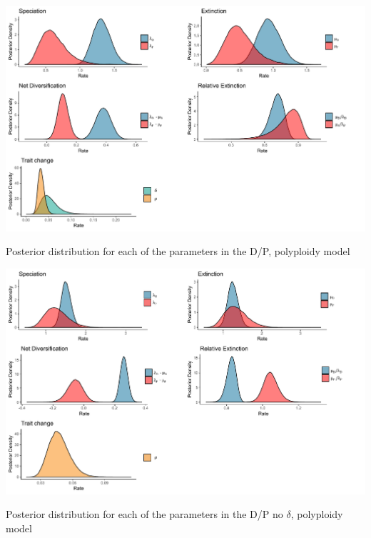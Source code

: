 \begin{suppfigure}
\includegraphics[width=\textwidth]{bisseDPposteriordist.pdf}
\caption{Posterior distribution for each of the parameters in the D/P, polyploidy model} %
\label{suppfigure:DP}
\end{suppfigure}

\begin{suppfigure}
\includegraphics[width=\textwidth]{bisseDPnodipposteriordist.pdf}
\caption{Posterior distribution for each of the parameters in the D/P no $\delta$, polyploidy model} %
\label{suppfigure:DPnodip}
\end{suppfigure}

